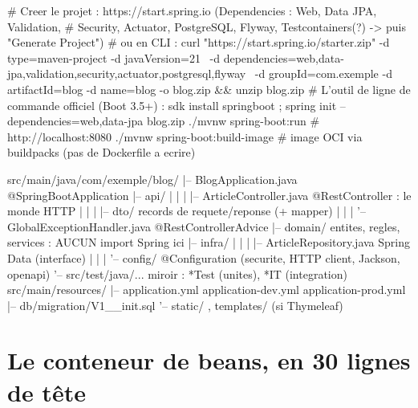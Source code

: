 \documentclass[12pt,a4paper,twoside,openright]{book}
\begin{document}
\begin{terminal}
# Creer le projet : https://start.spring.io (Dependencies : Web, Data JPA, Validation,
#   Security, Actuator, PostgreSQL, Flyway, Testcontainers(?) -> puis "Generate Project")
# ou en CLI :
curl "https://start.spring.io/starter.zip" -d type=maven-project -d javaVersion=21 \
  -d dependencies=web,data-jpa,validation,security,actuator,postgresql,flyway \
  -d groupId=com.exemple -d artifactId=blog -d name=blog -o blog.zip && unzip blog.zip
# L'outil de ligne de commande officiel (Boot 3.5+) :
sdk install springboot ; spring init --dependencies=web,data-jpa blog.zip
./mvnw spring-boot:run          # http://localhost:8080
./mvnw spring-boot:build-image  # image OCI via buildpacks (pas de Dockerfile a ecrire)
\end{terminal}

\begin{codeplain}
src/main/java/com/exemple/blog/
|-- BlogApplication.java                 @SpringBootApplication
|-- api/
|   |   |   |-- ArticleController.java           @RestController : le monde HTTP
|   |   |   |-- dto/                             records de requete/reponse (+ mapper)
|   |   |   '-- GlobalExceptionHandler.java      @RestControllerAdvice
|-- domain/                              entites, regles, services : AUCUN import Spring ici
|-- infra/
|   |   |   |-- ArticleRepository.java           Spring Data (interface)
|   |   |   '-- config/                          @Configuration (securite, HTTP client, Jackson, openapi)
'-- src/test/java/...                     miroir : *Test (unites), *IT (integration)
src/main/resources/
|-- application.yml  application-dev.yml  application-prod.yml
|-- db/migration/V1__init.sql
'-- static/ , templates/ (si Thymeleaf)
\end{codeplain}

\section{Le conteneur de beans, en 30 lignes de t\^ete}
\end{document}
